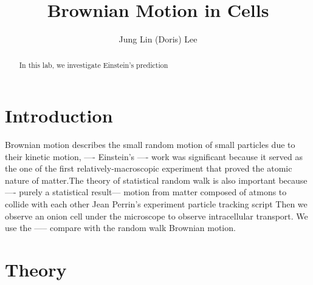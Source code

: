 \documentclass[iop,revtex4]{emulateapj_mod}
\begin{document}
\title{Brownian Motion in Cells}
\author{Jung Lin (Doris) Lee}
 \begin{abstract}
 In this lab, we investigate 
 Einstein's prediction 
 \end{abstract}
\nocite{*}
\section{Introduction}\label{sec:intro}
\par %
Brownian motion describes the small random motion of small particles due to their kinetic motion, ---- 
Einstein's ---- work was significant because it served as the one of the first relatively-macroscopic experiment that  proved the atomic nature of matter.The theory of statistical random walk is also important because ---- purely a statistical result--- 
motion from matter composed of atmons  to collide with each other
Jean Perrin's experiment 
particle tracking script  
Then we observe an onion cell under the microscope to observe intracellular transport. We use the ----- compare with the random walk Brownian motion.



\section{Theory}\label{sec:theory}
\end{document}
